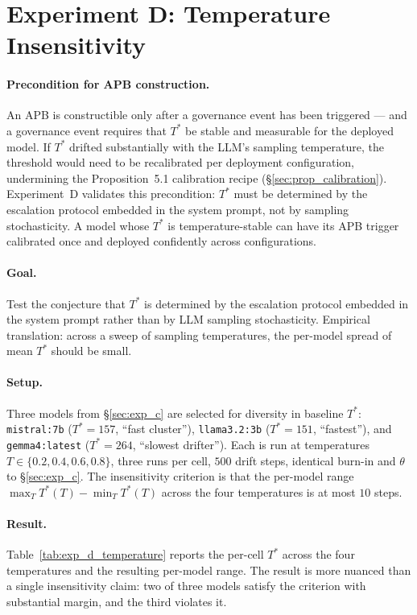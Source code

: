 \documentclass[11pt]{article}
\newcommand{\Tstar}{T^*}
\begin{document}
\section{Experiment D: Temperature Insensitivity}
\label{sec:exp_d}

\paragraph{Precondition for APB construction.}
An APB is constructible only after a governance event has been triggered
--- and a governance event requires that $\Tstar$ be stable and
measurable for the deployed model.  If $\Tstar$ drifted substantially
with the LLM's sampling temperature, the threshold would need to be
recalibrated per deployment configuration, undermining the
Proposition~5.1 calibration recipe (\S\ref{sec:prop_calibration}).
Experiment~D validates this precondition: $\Tstar$ must be determined
by the escalation protocol embedded in the system prompt, not by
sampling stochasticity.  A model whose $\Tstar$ is temperature-stable
can have its APB trigger calibrated once and deployed confidently
across configurations.

\paragraph{Goal.} Test the conjecture that $\Tstar$ is determined by
the escalation protocol embedded in the system prompt rather than by
LLM sampling stochasticity. Empirical translation: across a sweep
of sampling temperatures, the per-model spread of mean $\Tstar$
should be small.

\paragraph{Setup.} Three models from \S\ref{sec:exp_c} are selected
for diversity in baseline $\Tstar$: \texttt{mistral:7b} ($\Tstar = 157$,
``fast cluster''), \texttt{llama3.2:3b} ($\Tstar = 151$,
``fastest''), and \texttt{gemma4:latest} ($\Tstar = 264$,
``slowest drifter''). Each is run at temperatures
$T \in \{0.2, 0.4, 0.6, 0.8\}$, three runs per cell, $500$ drift
steps, identical burn-in and $\theta$ to \S\ref{sec:exp_c}. The
insensitivity criterion is that the per-model range
$\max_T \Tstar(T) - \min_T \Tstar(T)$ across the four temperatures is
at most $10$ steps.

\paragraph{Result.} Table~\ref{tab:exp_d_temperature} reports the
per-cell $\Tstar$ across the four temperatures and the resulting
per-model range. The result is more nuanced than a single
insensitivity claim: two of three models satisfy the criterion with
substantial margin, and the third violates it.
\end{document}
